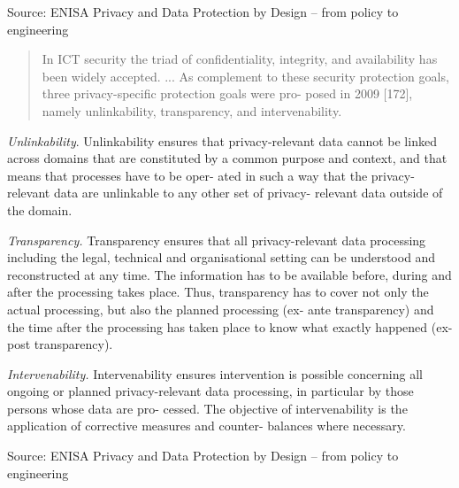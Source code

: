 \documentclass[Screen16to9,17pt]{foils}
\begin{document}
Source:
ENISA Privacy and Data Protection by Design
– from policy to engineering


\begin{quote}\small
In ICT
security the triad of confidentiality, integrity, and availability has been widely accepted. ...
As complement to these security protection goals, three privacy-specific protection goals were pro-
posed in 2009 [172], namely unlinkability, transparency, and intervenability.
\end{quote}

\begin{list2}
\item {\small \emph{Unlinkability}. Unlinkability ensures that privacy-relevant data cannot be linked across domains that are constituted by a common purpose and context, and that means that processes have to be oper-
ated in such a way that the privacy-relevant data are unlinkable to any other set of privacy-
relevant data outside of the domain.}
\item {\small \emph{Transparency.} Transparency ensures that all privacy-relevant data processing including the
legal, technical and organisational setting can be understood and reconstructed at any time.
The information has to be available before, during and after the processing takes place. Thus,
transparency has to cover not only the actual processing, but also the planned processing (ex-
ante transparency) and the time after the processing has taken place to know what exactly
happened (ex-post transparency).}
\item {\small \emph{Intervenability.} Intervenability ensures intervention is possible concerning all ongoing or
planned privacy-relevant data processing, in particular by those persons whose data are pro-
cessed. The objective of intervenability is the application of corrective measures and counter-
balances where necessary.}
\item Source:
ENISA Privacy and Data Protection by Design
– from policy to engineering
\end{list2}



\end{document}
